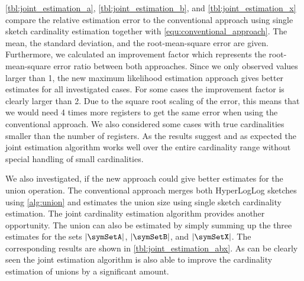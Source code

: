 \documentclass[a4paper]{scrartcl}
\begin{document}
\cref{tbl:joint_estimation_a}, \cref{tbl:joint_estimation_b}, and \cref{tbl:joint_estimation_x} compare the relative estimation error to the conventional approach using single sketch cardinality estimation together with \eqref{equ:conventional_approach}. The mean, the standard deviation, and the root-mean-square error are given. Furthermore, we calculated an improvement factor which represents the root-mean-square error ratio between both approaches. Since we only observed values larger than 1, the new maximum likelihood estimation approach gives better estimates for all investigated cases. For some cases the improvement factor is clearly larger than 2. Due to the  square root scaling of the error, this means that we would need 4 times more registers to get the same error when using the conventional approach. We also considered some cases with true cardinalities smaller  than the number of registers. As the results suggest and as expected the joint estimation algorithm works well over the entire cardinality range without special handling of small cardinalities.

We also investigated, if the new approach could give better estimates for the union operation. The conventional approach merges both HyperLogLog sketches using \cref{alg:union} and estimates the union size using single sketch cardinality estimation. The joint cardinality estimation algorithm provides another opportunity. The union can also be estimated by simply summing up the three estimates for the sets $|\symSetA|$, $|\symSetB|$, and $|\symSetX|$. The corresponding results are shown in \cref{tbl:joint_estimation_abx}. As can be clearly seen the joint estimation algorithm is also able to improve the cardinality estimation of unions by a significant amount.
\end{document}
